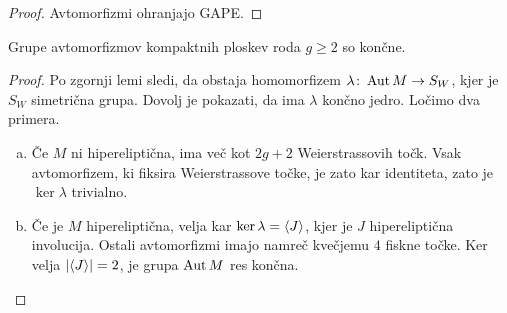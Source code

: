 \begin{proof}
Avtomorfizmi ohranjajo GAPE.
\end{proof}

\begin{izrek}[Schwarz]
Grupe avtomorfizmov kompaktnih ploskev roda $g \geq 2$ so končne.
\end{izrek}

\begin{proof}
Po zgornji lemi sledi, da obstaja homomorfizem
$\lambda \colon \operatorname{Aut} M \to S_W$, kjer je $S_W$ simetrična grupa.
Dovolj je pokazati, da ima $\lambda$ končno jedro. Ločimo dva
primera.

\begin{enumerate}[a)]
\item Če $M$ ni hipereliptična, ima več kot $2g + 2$
Weierstrassovih točk. Vsak avtomorfizem, ki fiksira Weierstrassove
točke, je zato kar identiteta, zato je $\ker \lambda$ trivialno.

\item Če je $M$ hipereliptična, velja kar
$\ker \lambda = \left\langle J\right\rangle$, kjer je $J$ hipereliptična involucija.
Ostali avtomorfizmi imajo namreč kvečjemu $4$ fiskne točke. Ker
velja $\left\lvert \left\langle J\right\rangle\right\rvert = 2$, je grupa $\operatorname{Aut} M$ res končna. \qedhere
\end{enumerate}
\end{proof}


